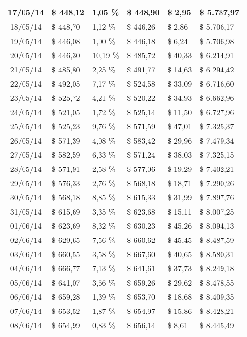 \begin{small}
\begin{longtable}{|c|l|l|l|l|l|}
17/05/14 & \$ 448,12 & 1,05 \% & \$ 448,90 & \$ 2,95 & \$ 5.737,97 \\ \hline
18/05/14 & \$ 448,70 & 1,12 \% & \$ 446,26 & \$ 2,86 & \$ 5.706,17 \\ \hline
19/05/14 & \$ 446,08 & 1,00 \% & \$ 446,18 & \$ 6,24 & \$ 5.706,98 \\ \hline
20/05/14 & \$ 446,30 & 10,19 \% & \$ 485,72 & \$ 40,33 & \$ 6.214,91 \\ \hline
21/05/14 & \$ 485,80 & 2,25 \% & \$ 491,77 & \$ 14,63 & \$ 6.294,42 \\ \hline
22/05/14 & \$ 492,05 & 7,17 \% & \$ 524,58 & \$ 33,09 & \$ 6.716,60 \\ \hline
23/05/14 & \$ 525,72 & 4,21 \% & \$ 520,22 & \$ 34,93 & \$ 6.662,96 \\ \hline
24/05/14 & \$ 521,05 & 1,72 \% & \$ 525,14 & \$ 11,50 & \$ 6.727,96 \\ \hline
25/05/14 & \$ 525,23 & 9,76 \% & \$ 571,59 & \$ 47,01 & \$ 7.325,37 \\ \hline
26/05/14 & \$ 571,39 & 4,08 \% & \$ 583,42 & \$ 29,96 & \$ 7.479,34 \\ \hline
27/05/14 & \$ 582,59 & 6,33 \% & \$ 571,24 & \$ 38,03 & \$ 7.325,15 \\ \hline
28/05/14 & \$ 571,91 & 2,58 \% & \$ 577,06 & \$ 19,29 & \$ 7.402,21 \\ \hline
29/05/14 & \$ 576,33 & 2,76 \% & \$ 568,18 & \$ 18,71 & \$ 7.290,26 \\ \hline
30/05/14 & \$ 568,18 & 8,85 \% & \$ 615,33 & \$ 31,99 & \$ 7.897,76 \\ \hline
31/05/14 & \$ 615,69 & 3,35 \% & \$ 623,68 & \$ 15,11 & \$ 8.007,25 \\ \hline
01/06/14 & \$ 623,69 & 8,32 \% & \$ 630,23 & \$ 45,26 & \$ 8.094,13 \\ \hline
02/06/14 & \$ 629,65 & 7,56 \% & \$ 660,62 & \$ 45,45 & \$ 8.487,59 \\ \hline
03/06/14 & \$ 660,55 & 3,58 \% & \$ 667,60 & \$ 40,65 & \$ 8.580,31 \\ \hline
04/06/14 & \$ 666,77 & 7,13 \% & \$ 641,61 & \$ 37,73 & \$ 8.249,18 \\ \hline
05/06/14 & \$ 641,07 & 3,66 \% & \$ 659,26 & \$ 29,62 & \$ 8.478,55 \\ \hline
06/06/14 & \$ 659,28 & 1,39 \% & \$ 653,70 & \$ 18,68 & \$ 8.409,35 \\ \hline
07/06/14 & \$ 653,52 & 1,87 \% & \$ 654,97 & \$ 15,86 & \$ 8.428,21 \\ \hline
08/06/14 & \$ 654,99 & 0,83 \% & \$ 656,14 & \$ 8,61 & \$ 8.445,49 \\ \hline

\end{longtable}
\end{small}
